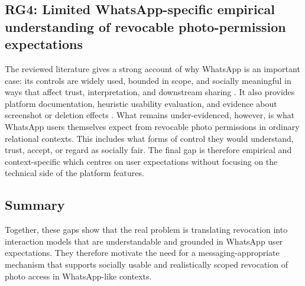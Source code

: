 \subsection{RG4: Limited WhatsApp-specific empirical understanding of revocable photo-permission expectations}
The reviewed literature gives a strong account of why WhatsApp is an important case: its controls are widely used, bounded in scope, and socially meaningful in ways that affect trust, interpretation, and downstream sharing \cite{whatsapp_advanced_chat_privacy,whatsapp_delete_messages,schnitzler_2020,ingber_2025}. It also provides platform documentation, heuristic usability evaluation, and evidence about screenshot or deletion effects \cite{albesher_2021,schnitzler_2020,heath_2023,ingber_2025}. What remains under-evidenced, however, is what WhatsApp users themselves expect from revocable photo permissions in ordinary relational contexts. This includes what forms of control they would understand, trust, accept, or regard as socially fair. The final gap is therefore empirical and context-specific which centres on user expectations without focusing on the technical side of the platform features.

\subsection{Summary}
Together, these gaps show that the real problem is translating revocation into interaction models that are understandable and grounded in WhatsApp user expectations. They therefore motivate the need for a messaging-appropriate mechanism that supports socially usable and realistically scoped revocation of photo access in WhatsApp-like contexts.

